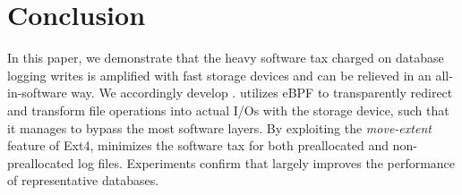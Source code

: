 \section{Conclusion}\label{sec:conclusion}

In this paper, 
we demonstrate  that the heavy software tax charged on database logging  writes
is amplified with fast storage devices and
 can be relieved 
in an all-in-software way. We accordingly develop \odes.
\odes
utilizes eBPF to transparently redirect and transform  file operations into actual I/Os with the storage device,
such that  it manages to bypass the most software layers.
By exploiting the {\em move-extent} feature of Ext4,
\odes minimizes the software tax for
both
preallocated and non-preallocated log files.
 Experiments confirm that \odes largely improves the  performance of representative databases.
